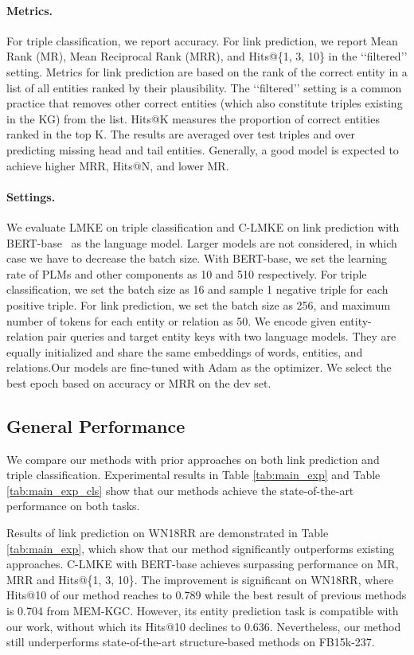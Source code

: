 \documentclass{article}
\begin{document}
\paragraph{\textbf{Metrics.}}  
For triple classification, we report accuracy.
For link prediction, we report Mean Rank (MR), Mean Reciprocal Rank (MRR), and Hits@\{1, 3, 10\} in the ‘‘filtered’’ setting. 
Metrics for link prediction are based on the rank of the correct entity in a list of all entities ranked by their plausibility. 
The ‘‘filtered’’ setting is a common practice that removes other correct entities (which also constitute triples existing in the KG) from the list.
Hits@K measures the proportion of correct entities ranked in the top K.
The results are averaged over test triples and over predicting missing head and tail entities. 
Generally, a good model is expected to achieve higher MRR, Hits@N, and lower MR. 

\paragraph{\textbf{Settings.}}
We evaluate LMKE on triple classification and C-LMKE on link prediction
with BERT-base~\cite{devlin2018bert} as the language model. 
Larger models are not considered, in which case we have to decrease the batch size.
With BERT-base, we set the learning rate of PLMs and  other components as 10  and 510 respectively. 
For triple classification, we set the batch size as 16 and sample 1 negative triple for each positive triple. 
For link prediction, we set the batch size as 256, and maximum number of tokens for each entity or relation as 50. We encode given entity-relation pair queries and target entity keys with two language models. They are equally initialized and share the same embeddings of words, entities, and relations.Our models are fine-tuned with Adam as the optimizer. 
We select the best epoch based on accuracy or MRR on the dev set.  


\subsection{General Performance}


We compare our methods with prior approaches on both link prediction and triple classification.
Experimental results in Table \ref{tab:main_exp} and Table \ref{tab:main_exp_cls}  show that our methods achieve the state-of-the-art performance on both tasks.

Results of link prediction on WN18RR are demonstrated in Table \ref{tab:main_exp}, which show that 
our method significantly outperforms existing approaches.
C-LMKE with BERT-base achieves surpassing performance on MR, MRR and Hits@\{1, 3, 10\}.
The improvement is significant on WN18RR, where Hits@10 of our method reaches to 0.789 while the best result of previous methods is 0.704 from MEM-KGC. 
However, its entity prediction task is compatible with our work, without which its Hits@10 declines to 0.636. 
Nevertheless, our method still underperforms state-of-the-art structure-based methods on FB15k-237.
\end{document}
